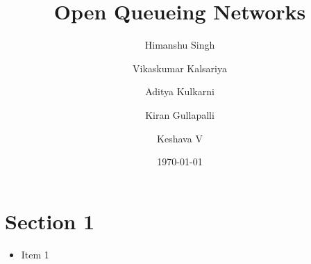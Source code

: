 \documentclass[10pt,notes]{beamer}
\title{Open Queueing Networks}
\author{Himanshu Singh \and Vikaskumar Kalsariya \and Aditya Kulkarni \and Kiran Gullapalli \and Keshava V}
\date{\today}
\begin{document}
\begin{frame}
    \titlepage
\end{frame}

\begin{frame}
    \tableofcontents
\end{frame}

\section{Section 1}

\begin{frame}
    \begin{itemize}
        \item Item 1
    \end{itemize}
\end{frame}

\end{document}
